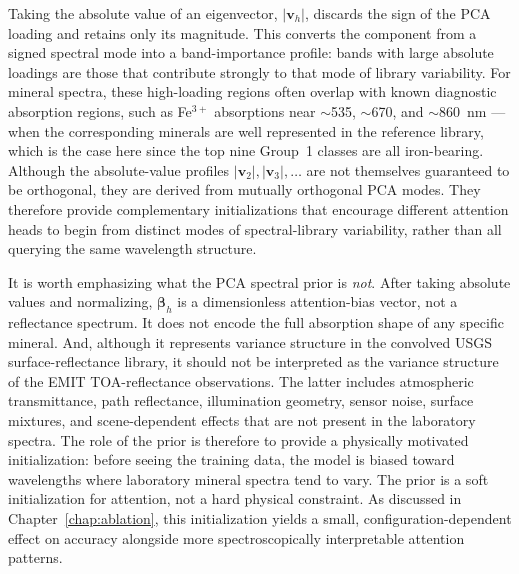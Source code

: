 \documentclass[11pt]{report}
\begin{document}
Taking the absolute value of an eigenvector, $|\mathbf{v}_h|$, discards the sign of the PCA loading and retains only its magnitude. This converts the component from a signed spectral mode into a band-importance profile: bands with large absolute loadings are those that contribute strongly to that mode of library variability. For mineral spectra, these high-loading regions often overlap with known diagnostic absorption regions, such as Fe$^{3+}$ absorptions near $\sim$535, $\sim$670, and $\sim$860~nm --- when the corresponding minerals are well represented in the reference library, which is the case here since the top nine Group~1 classes are all iron-bearing. Although the absolute-value profiles $|\mathbf{v}_2|, |\mathbf{v}_3|, \ldots$ are not themselves guaranteed to be orthogonal, they are derived from mutually orthogonal PCA modes. They therefore provide complementary initializations that encourage different attention heads to begin from distinct modes of spectral-library variability, rather than all querying the same wavelength structure.

It is worth emphasizing what the PCA spectral prior is \emph{not}.
After taking absolute values and normalizing, $\bm{\beta}_h$ is a dimensionless attention-bias vector, not a reflectance spectrum.
It does not encode the full absorption shape of any specific mineral.
And, although it represents variance structure in the convolved USGS surface-reflectance library, it should not be interpreted as the variance structure of the EMIT TOA-reflectance observations.
The latter includes atmospheric transmittance, path reflectance, illumination geometry, sensor noise, surface mixtures, and scene-dependent effects that are not present in the laboratory spectra.
The role of the prior is therefore to provide a physically motivated initialization: before seeing the training data, the model is biased toward wavelengths where laboratory mineral spectra tend to vary.
The prior is a soft initialization for attention, not a hard physical constraint.
As discussed in Chapter~\ref{chap:ablation}, this initialization yields a small, configuration-dependent effect on accuracy alongside more spectroscopically interpretable attention patterns.
\end{document}
